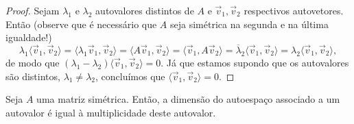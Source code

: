 \begin{proof}
	Sejam $\lambda_1$ e  $\lambda_2$ autovalores distintos de $A$ e $\vec{v}_1, \vec{v}_2$ respectivos autovetores. Então (observe que é necessário que $A$ seja simétrica na segunda e na última igualdade!)
	\begin{equation}
	\lambda_1 \langle \vec{v}_1, \vec{v}_2\rangle = \langle \lambda_1 \vec{v}_1, \vec{v}_2\rangle = \langle A \vec{v}_1, \vec{v}_2\rangle = \langle \vec{v}_1, A \vec{v}_2\rangle = \overline{\lambda}_2 \langle \vec{v}_1, \vec{v}_2\rangle = \lambda_2 \langle \vec{v}_1, \vec{v}_2\rangle,
	\end{equation} de modo que $(\lambda_1 - \lambda_2)\langle \vec{v}_1, \vec{v}_2\rangle = 0$. Já que estamos supondo que os autovalores são distintos, $\lambda_1 \neq \lambda_2$, concluímos que $\langle \vec{v}_1, \vec{v}_2\rangle = 0$.
\end{proof}


\begin{prop}\label{dimens}
	Seja $A$ uma matriz simétrica. Então, a dimensão do autoespaço associado a um autovalor é igual à multiplicidade deste autovalor.
\end{prop}

